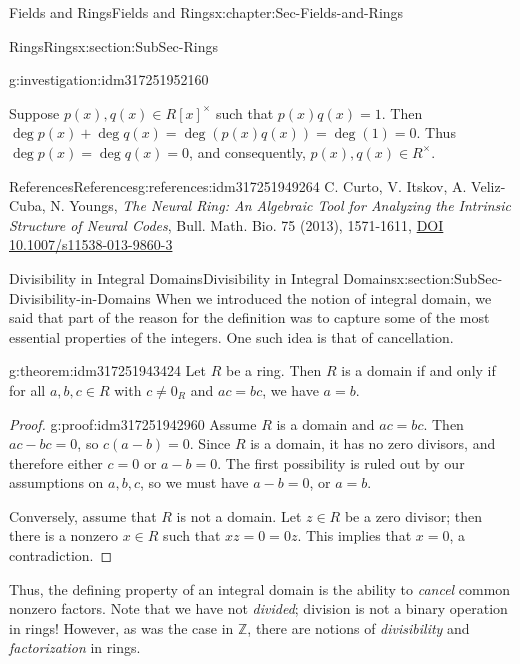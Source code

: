 \documentclass[oneside,10pt,]{book}
\numberwithin{equation}{section}
\def\Z{{\mathbb Z}}
\begin{document}
\begin{chapterptx}{Fields and Rings}{}{Fields and Rings}{}{}{x:chapter:Sec-Fields-and-Rings}
\begin{sectionptx}{Rings}{}{Rings}{}{}{x:section:SubSec-Rings}
\begin{investigation}{}{g:investigation:idm317251952160}
\par
Suppose \(p(x),q(x)\in R[x]^\times\) such that \(p(x) q(x) = 1\). Then \(\deg p(x) + \deg q(x) = \deg(p(x) q(x)) = \deg(1) = 0\). Thus \(\deg p(x) = \deg q(x) = 0\), and consequently, \(p(x),q(x)\in R^\times\).%
\end{investigation}
%
%
\typeout{************************************************}
\typeout{************************************************}
%
\begin{references-subsection-numberless}{References}{}{References}{}{}{g:references:idm317251949264}
C. Curto, V. Itskov, A. Veliz-Cuba, N. Youngs, \emph{The Neural Ring: An Algebraic Tool for Analyzing the Intrinsic Structure of Neural Codes}, Bull. Math. Bio. 75 (2013), 1571-1611, \href{https://doi.org/10.1007/s11538-013-9860-3}{DOI 10.1007\slash{}s11538-013-9860-3}\end{references-subsection-numberless}
\end{sectionptx}
%
%
\typeout{************************************************}
\typeout{************************************************}
%
\begin{sectionptx}{Divisibility in Integral Domains}{}{Divisibility in Integral Domains}{}{}{x:section:SubSec-Divisibility-in-Domains}
When we introduced the notion of integral domain, we said that part of the reason for the definition was to capture some of the most essential properties of the integers. One such idea is that of cancellation.%
\begin{theorem}{}{}{g:theorem:idm317251943424}%
Let \(R\) be a ring. Then \(R\) is a domain if and only if for all \(a,b,c\in R\) with \(c\ne 0_R\) and \(ac = bc\), we have \(a = b\).%
\end{theorem}
\begin{proof}{}{g:proof:idm317251942960}
Assume \(R\) is a domain and \(ac = bc\). Then \(ac - bc = 0\), so \(c(a-b) = 0\). Since \(R\) is a domain, it has no zero divisors, and therefore either \(c = 0\) or \(a-b=0\). The first possibility is ruled out by our assumptions on \(a,b,c\), so we must have \(a-b = 0\), or \(a =b\).%
\par
Conversely, assume that \(R\) is not a domain. Let \(z\in R\) be a zero divisor; then there is a nonzero \(x\in R\) such that \(xz = 0 = 0 z\). This implies that \(x = 0\), a contradiction.%
\end{proof}
Thus, the defining property of an integral domain is the ability to \emph{cancel} common nonzero factors. Note that we have not \emph{divided}; division is not a binary operation in rings! However, as was the case in \(\Z\), there are notions of \emph{divisibility} and \emph{factorization} in rings.%

\end{sectionptx}
\end{chapterptx}
\end{document}
